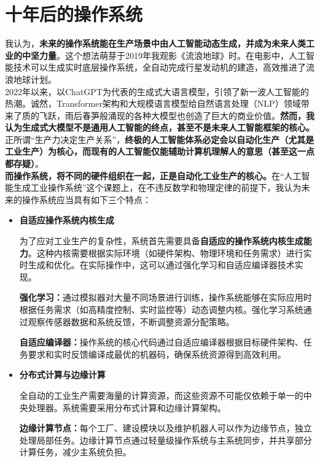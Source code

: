 \documentclass[UTF8]{homework}
\begin{document}
\begin{homeworkProblem}
\begin{itemize}
\end{itemize}

\section{十年后的操作系统}

我认为，\textbf{未来的操作系统能在生产场景中由人工智能动态生成，并成为未来人类工业的中坚力量}。这个想法萌芽于2019年我观影《流浪地球》时。在电影中，人工智能技术可以生成实时底层操作系统，全自动完成行星发动机的建造，高效推进了流浪地球计划。\\

2022年以来，以ChatGPT为代表的生成式大语言模型，引领了新一波人工智能的热潮。诚然，Transformer架构和大规模语言模型给自然语言处理（NLP）领域带来了质的飞跃，雨后春笋般涌现的各种大模型也创造了巨大的商业价值。\textbf{然而，我认为生成式大模型不是通用人工智能的终点，甚至不是未来人工智能框架的核心。}正所谓“生产力决定生产关系”，\textbf{终极的人工智能体系必定会以自动化生产（尤其是工业生产）为核心，而现有的人工智能仅能辅助计算机理解人的意思（甚至这一点都存疑）}。\\

\textbf{而操作系统，将不同的硬件组织在一起，正是自动化工业生产的核心。}在“人工智能生成工业操作系统”这个课题上，在不违反数学和物理定律的前提下，我认为未来的操作系统应当具有如下三个特点：

\begin{itemize}
	\item \textbf{自适应操作系统内核生成}
	
	为了应对工业生产的复杂性，系统首先需要具备\textbf{自适应的操作系统内核生成能力}。这种内核需要根据实际环境（如硬件架构、物理环境和任务需求）进行实时生成和优化。在实际操作中，这可以通过强化学习和自适应编译器技术实现。
	
	\textbf{强化学习：}通过模拟器对大量不同场景进行训练，操作系统能够在实际应用时根据任务需求（如高精度控制、实时监控等）动态调整内核。强化学习系统通过观察传感器数据和系统反馈，不断调整资源分配策略。
	
	\textbf{自适应编译器：}操作系统的核心代码通过自适应编译器根据目标硬件架构、任务要求和实时反馈编译成最优的机器码，确保系统资源得到高效利用。\\
	
	\item \textbf{分布式计算与边缘计算}
	
	全自动的工业生产需要海量的计算资源，而这些资源不可能仅依赖于单一的中央处理器。系统需要采用分布式计算和边缘计算架构。
	
	\textbf{边缘计算节点：}每个工厂、建设模块以及维护机器人可以作为边缘节点，独立处理局部任务。边缘计算节点通过轻量级操作系统与主系统同步，并共享部分计算任务，减少主系统负担。
	

\end{itemize}
\end{homeworkProblem}
\end{document}
